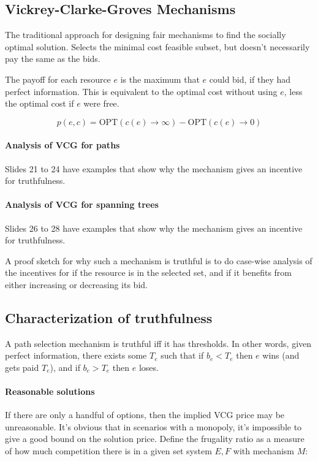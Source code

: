 \documentclass{idc_msc}
\begin{document}
\subsection{Vickrey-Clarke-Groves Mechanisms}

The traditional approach for designing fair mechanisms to find the socially optimal solution.
Selects the minimal cost feasible subset, but doesn't necessarily pay the same as the bids.

The payoff for each resource \(e\) is the maximum that \(e\) could bid, if they had perfect information.
This is equivalent to the optimal cost without using \(e\), less the optimal cost if \(e\) were free.

\[p(e,c) = \text{OPT}(c(e) \to \infty) - \text{OPT}(c(e) \to 0)\]

\paragraph{Analysis of VCG for paths}

Slides 21 to 24 have examples that show why the mechanism gives an incentive for truthfulness.

\paragraph{Analysis of VCG for spanning trees}

Slides 26 to 28 have examples that show why the mechanism gives an incentive for truthfulness.

A proof sketch for why such a mechanism is truthful is to do case-wise analysis of the incentives for if the resource is in the selected set, and if it benefits from either increasing or decreasing its bid.

\subsection{Characterization of truthfulness}

A path selection mechanism is truthful iff it has thresholds.
In other words, given perfect information, there exists some \(T_e\) such that if \(b_e < T_e\) then \(e\) wins (and gets paid \(T_e\)), and if \(b_e > T_e\) then \(e\) loses.

\paragraph{Reasonable solutions}

If there are only a handful of options, then the implied VCG price may be unreasonable.
It's obvious that in scenarios with a monopoly, it's impossible to give a good bound on the solution price.
Define the frugality ratio as a measure of how much competition there is in a given set system \(E,F\) with mechanism \(M\):
\end{document}
